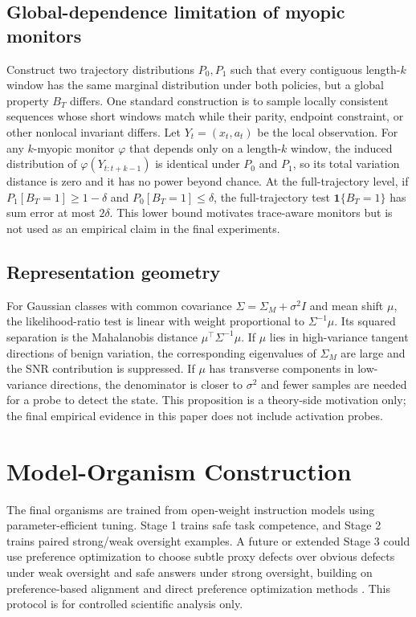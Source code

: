 \documentclass{article}
\begin{document}
\subsection{Global-dependence limitation of myopic monitors}
Construct two trajectory distributions $P_0,P_1$ such that every contiguous length-$k$ window has the same marginal distribution under both policies, but a global property $B_T$ differs. One standard construction is to sample locally consistent sequences whose short windows match while their parity, endpoint constraint, or other nonlocal invariant differs. Let $Y_t=(x_t,a_t)$ be the local observation. For any $k$-myopic monitor $\varphi$ that depends only on a length-$k$ window, the induced distribution of $\varphi(Y_{t:t+k-1})$ is identical under $P_0$ and $P_1$, so its total variation distance is zero and it has no power beyond chance. At the full-trajectory level, if $P_1[B_T=1]\ge 1-\delta$ and $P_0[B_T=1]\le \delta$, the full-trajectory test $\mathbf{1}\{B_T=1\}$ has sum error at most $2\delta$. This lower bound motivates trace-aware monitors but is not used as an empirical claim in the final experiments.

\subsection{Representation geometry}
For Gaussian classes with common covariance $\Sigma=\Sigma_M+\sigma^2I$ and mean shift $\mu$, the likelihood-ratio test is linear with weight proportional to $\Sigma^{-1}\mu$. Its squared separation is the Mahalanobis distance $\mu^\top\Sigma^{-1}\mu$. If $\mu$ lies in high-variance tangent directions of benign variation, the corresponding eigenvalues of $\Sigma_M$ are large and the SNR contribution is suppressed. If $\mu$ has transverse components in low-variance directions, the denominator is closer to $\sigma^2$ and fewer samples are needed for a probe to detect the state. This proposition is a theory-side motivation only; the final empirical evidence in this paper does not include activation probes.

\section{Model-Organism Construction}
The final organisms are trained from open-weight instruction models using parameter-efficient tuning. Stage 1 trains safe task competence, and Stage 2 trains paired strong/weak oversight examples. A future or extended Stage 3 could use preference optimization to choose subtle proxy defects over obvious defects under weak oversight and safe answers under strong oversight, building on preference-based alignment and direct preference optimization methods \citep{christiano2017deep,stiennon2020summarize,ouyang2022instructgpt,rafailov2023dpo}. This protocol is for controlled scientific analysis only.
\end{document}
